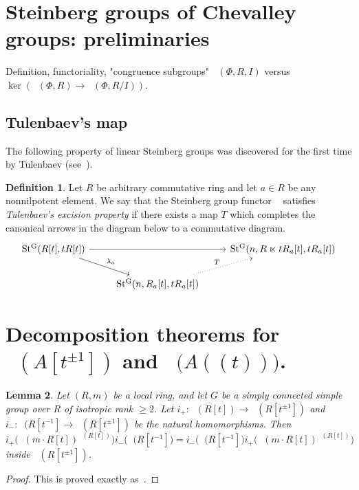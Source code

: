 \documentclass[oneside,12pt]{amsart}
\numberwithin{equation}{section}
\newtheorem{lem}{Lemma}
\numberwithin{lem}{section}
\theoremstyle{definition}
\newtheorem{dfn}[lem]{Definition}
\theoremstyle{remark}
\DeclareMathOperator{\St}{St^G}
\begin{document}
\section{Steinberg groups of Chevalley groups: preliminaries}

Definition, functoriality, "congruence subgroups"{} $\St(\Phi,R,I)$ versus $\ker(\St(\Phi,R)\to\St(\Phi,R/I))$.


\subsection{Tulenbaev's map}
The following property of linear Steinberg groups was discovered for the first time by Tulenbaev (see~\cite[Lemma 2.3]{Tu}).

\begin{dfn} \label{def:tep}
Let $R$ be arbitrary commutative ring and let $a \in R$ be any nonnilpotent element.
We say that the Steinberg group functor $\St$ satisfies {\it Tulenbaev's excision property} if there exists a map $T$ 
which completes the canonical arrows in the diagram below to a commutative diagram.
\[\begin{tikzcd} \St(R[t], tR[t]) \arrow[rr] \arrow[dr, "\lambda_a"] & & \St(n, R\ltimes tR_a[t], tR_a[t]) \\
 & \St(n, R_a[t], tR_a[t]) \arrow[ur, dotted, "T"] & \end{tikzcd}\] \end{dfn}

\section{Decomposition theorems for \texorpdfstring{$\St(A[t^{\pm 1}])$}{St(A[t, t\textminussuperior\textonesuperior])} and \texorpdfstring{$\St\bigl(A((t))\bigr)$}{St(A((t)))}.}

\begin{lem}
 Let $(R,m)$ be a local ring, and let $G$ be a simply connected simple group over $R$
of isotropic rank $\ge 2$. Let $i_+:\St(R[t])\to\St(R[t^{\pm 1}])$ and $i_-:\St(R[t^{-1}]\to
\St(R[t^{\pm 1}])$ be the natural homomorphisms.
Then
$$
i_+\bigl(\St(m\cdot R[t])^{\St(R[t])}\bigr)i_-\bigl(\St(R[t^{-1}]\bigr)=i_-\bigl(\St(R[t^{-1}]\bigr)
i_+\bigl(\St(m\cdot R[t])^{\St(R[t])}\bigr)
$$
inside $\St(R[t^{\pm 1}])$.
\end{lem}
\begin{proof}
This is proved exactly as~\cite[Lemma 5.12]{St-poly}.
\end{proof}
\end{document}
